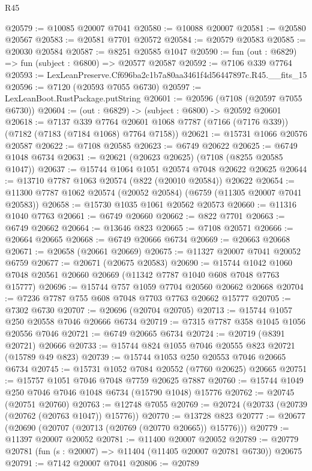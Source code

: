 \begin{lexlean}{R45}
\begin{coremodule}
{@20579 := @10085 @20007 @7041
@20580 := @10088 @20007
@20581 := @20580 @20567
@20583 := @20581 @7701 @20572
@20584 := @20579 @20583
@20585 := @20030 @20584
@20587 := @8251 @20585 @1047
@20590 := fun (out : @6829) => fun (subject : @6800) => @20577 @20587
@20592 := @7106 @339 @7764
@20593 := LexLeanPreserve.Cf696ba2c1b7a80aa3461f4d56447897c.R45.__fits_15
@20596 := @7120 (@20593 @7055 @6730)
@20597 := LexLeanBoot.RustPackage.putString
@20601 := @20596 (@7108 (@20597 @7055 @6730))
@20604 := (out : @6829) -> (subject : @6800) -> @20592 @20601
@20618 := @7137
    @339
    @7764
    @20601
    @1068
    @7787
    (@7166 (@7176 @339))
    (@7182 (@7183 (@7184 @1068) @7764 @7158))
@20621 := @15731 @1066 @20576 @20587
@20622 := @7108 @20585
@20623 := @6749 @20622
@20625 := @6749 @1048 @6734
@20631 := @20621 (@20623 @20625) (@7108 (@8255 @20585 @1047))
@20637 := @15744 @1064 @1051 @20574 @7048 @20622 @20625
@20644 := @13710 @7787 @1063 @20574 (@822 (@20010 @20584)) @20622
@20654 := @11300 @7787 @1062 @20574 (@20052 @20584) (@6759 (@11305 @20007 @7041 @20583))
@20658 := @15730 @1035 @1061 @20562 @20573
@20660 := @11316 @1040 @7763
@20661 := @6749 @20660
@20662 := @822 @7701
@20663 := @6749 @20662
@20664 := @13646 @823
@20665 := @7108 @20571
@20666 := @20664 @20665
@20668 := @6749 @20666 @6734
@20669 := @20663 @20668
@20671 := @20658 (@20661 @20669)
@20675 := @11327 @20007 @7041 @20052 @6759
@20677 := @20671 (@20675 @20583)
@20690 := @15744 @1042 @1060 @7048 @20561 @20660 @20669 (@11342 @7787 @1040 @608 @7048 @7763 @15777)
@20696 := @15744 @757 @1059 @7704 @20560 @20662 @20668
@20704 := @7236 @7787 @755 @608 @7048 @7703 @7763 @20662 @15777
@20705 := @7302 @6730
@20707 := @20696 (@20704 @20705)
@20713 := @15744 @1057 @250 @20558 @7046 @20666 @6734
@20719 := @7315 @7787 @358 @1045 @1056 @20556 @7046
@20721 := @6749 @20665 @6734
@20724 := @20719 (@8391 @20721) @20666
@20733 := @15744 @824 @1055 @7046 @20555 @823 @20721 (@15789 @49 @823)
@20739 := @15744 @1053 @250 @20553 @7046 @20665 @6734
@20745 := @15731 @1052 @7084 @20552 (@7760 @20625) @20665
@20751 := @15757 @1051 @7046 @7048 @7759 @20625 @7887
@20760 := @15744 @1049 @250 @7046 @7046 @1048 @6734 (@15790 @1048) @15776
@20762 := @20745 (@20751 @20760)
@20763 := @12748 @7055
@20769 := @20724 (@20733 (@20739 (@20762 (@20763 @1047)) @15776))
@20770 := @13728 @823
@20777 := @20677 (@20690 (@20707 (@20713 (@20769 (@20770 @20665)) @15776)))
@20779 := @11397 @20007 @20052
@20781 := @11400 @20007 @20052
@20789 := @20779 @20781 (fun (s : @20007) => @11404 (@11405 @20007 @20781 @6730)) @20675
@20791 := @7142 @20007 @7041
@20806 := @20789
}
\end{coremodule}
\end{lexlean}
